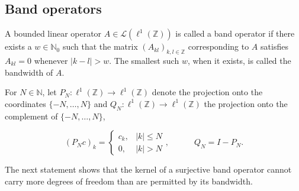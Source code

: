 \documentclass[reqno,a4paper,12pt]{amsart}
\numberwithin{equation}{section}
\def\N{{\mathbb N}}
\def\Z{{\mathbb Z}}
\newcommand\1{\mathds{1}}
\newcommand{\abs}[1]{\left\lvert #1 \right\rvert}
\begin{document}
\subsection{Band operators}
 A bounded linear operator $A\in \mathcal L(\ell^1(\mathbb Z))$ is called a {band operator} if there exists a $w\in\mathbb N_0$ such that the matrix $(A_{kl})_{k,l \in \Z}$ corresponding to $A$ satisfies
$
A_{kl}=0
$
whenever $|k-l|>w$.
The smallest such $w$, when it exists, is called the bandwidth of $A$.

For $N\in \N$, let $P_N : \ell^1(\Z) \to \ell^1(\Z)$ denote the projection onto the coordinates $\{ -N, \dots, N \}$ and $Q_N: \ell^1(\Z) \to \ell^1(\Z)$ the projection onto the complement of $\{ -N, \dots, N \}$,

\begin{equation}\label{eq:projections}
    (P_N c)_k=
\begin{cases}
c_k,& \abs{k}\leq N\\
0,& \abs{k}>N
\end{cases},
\qquad \quad  Q_N=I-P_N.
\end{equation}

The next statement shows that the kernel of a surjective band operator cannot carry more degrees of freedom than are permitted by its bandwidth.
\end{document}
